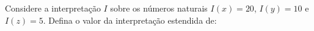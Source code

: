 
\question[10]

Considere a interpretação $I$ sobre os números naturais $I(x) = 20$, $I(y) = 10$ e $I(z) = 5$. Defina o valor da interpretação estendida de:



